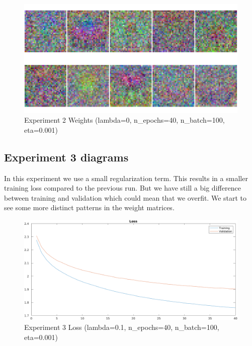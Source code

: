     \begin{figure}[ht]
        \includegraphics[width=\textwidth]{../code/result_pics/lambda=0, n_epochs=40, n_batch=100, eta=.001/weights.png}
        \caption{Experiment 2 Weights (lambda=0, n\_epochs=40, n\_batch=100, eta=0.001)}
        \label{fig:weights2}
    \end{figure}

\clearpage
\subsection{Experiment 3 diagrams}
In this experiment we use a small regularization term. This results in a smaller training loss compared to the previous run.
But we have still a big difference between training and validation which could mean that we overfit. We start to see some more distinct patterns
in the weight matrices.

    \begin{figure}[ht]
        \includegraphics[width=\textwidth]{../code/result_pics/lambda=.1, n_epochs=40, n_batch=100, eta=.001/loss.png}
        \caption{Experiment 3 Loss (lambda=0.1, n\_epochs=40, n\_batch=100, eta=0.001)}
        \label{fig:loss3}
    \end{figure}

